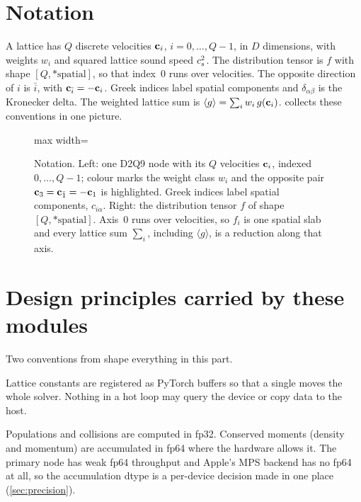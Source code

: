 \section{Notation}

A lattice has $Q$ discrete velocities $\mathbf{c}_i$, $i = 0,\dots,Q-1$, in $D$ dimensions, with
weights $w_i$ and squared lattice sound speed $c_s^2$. The distribution tensor is $f$ with
shape $[Q, *\text{spatial}]$, so that index~0 runs over velocities. The opposite direction
of $i$ is $\bar{i}$, with $\mathbf{c}_{\bar{i}} = -\mathbf{c}_i$. Greek indices label spatial components
and $\delta_{\alpha\beta}$ is the Kronecker delta. The weighted lattice sum is
$\langle g \rangle = \sum_i w_i\, g(\mathbf{c}_i)$.
 collects these conventions in one picture.

\begin{figure}[h]
\centering
\begin{adjustbox}{max width=\linewidth}\end{adjustbox}
\caption{Notation. Left: one D2Q9 node with its $Q$ velocities $\mathbf{c}_i$, indexed
$0,\dots,Q-1$; colour marks the weight class $w_i$ and the opposite pair
$\mathbf{c}_3 = \mathbf{c}_{\bar{1}} = -\mathbf{c}_1$ is highlighted. Greek indices label spatial components,
$c_{i\alpha}$. Right: the distribution tensor $f$ of shape $[Q, *\text{spatial}]$. Axis~0 runs
over velocities, so $f_i$ is one spatial slab and every lattice sum $\sum_i$, including
$\langle g \rangle$, is a reduction along that axis.}
\label{fig:notation}
\end{figure}


\section{Design principles carried by these modules}

Two conventions from  shape everything in this part.

\begin{description}[style=nextline]
\item[One device and dtype context.]
Lattice constants are registered as PyTorch buffers so that a single
 moves the whole solver. Nothing in a hot loop may query the
device or copy data to the host.

\item[fp32 compute, fp64 accumulation.]
Populations and collisions are computed in fp32. Conserved moments (density and momentum)
are accumulated in fp64 where the hardware allows it. The primary node has weak fp64
throughput and Apple's MPS backend has no fp64 at all, so the accumulation dtype is a
per-device decision made in one place (\cref{sec:precision}).
\end{description}

